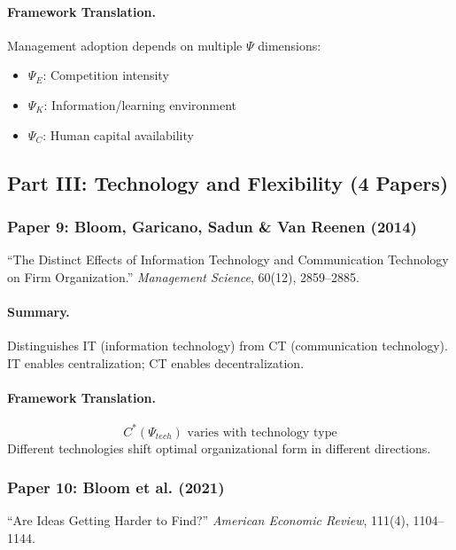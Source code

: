 \documentclass[12pt,a4paper]{article}
\begin{document}
\paragraph{Framework Translation.}
Management adoption depends on multiple $\Psi$ dimensions:
\begin{itemize}
  \item $\Psi_E$: Competition intensity
  \item $\Psi_K$: Information/learning environment
  \item $\Psi_C$: Human capital availability
\end{itemize}

\subsection{Part III: Technology and Flexibility (4 Papers)}

\subsubsection{Paper 9: Bloom, Garicano, Sadun \& Van Reenen (2014)}

``The Distinct Effects of Information Technology and Communication Technology on Firm Organization.''
\textit{Management Science}, 60(12), 2859--2885.

\paragraph{Summary.}
Distinguishes IT (information technology) from CT (communication technology).
IT enables centralization; CT enables decentralization.

\paragraph{Framework Translation.}
\begin{equation}
  C^*(\Psi_{tech}) \text{ varies with technology type}
\end{equation}
Different technologies shift optimal organizational form in different directions.

\subsubsection{Paper 10: Bloom et al. (2021)}

``Are Ideas Getting Harder to Find?''
\textit{American Economic Review}, 111(4), 1104--1144.
\end{document}
